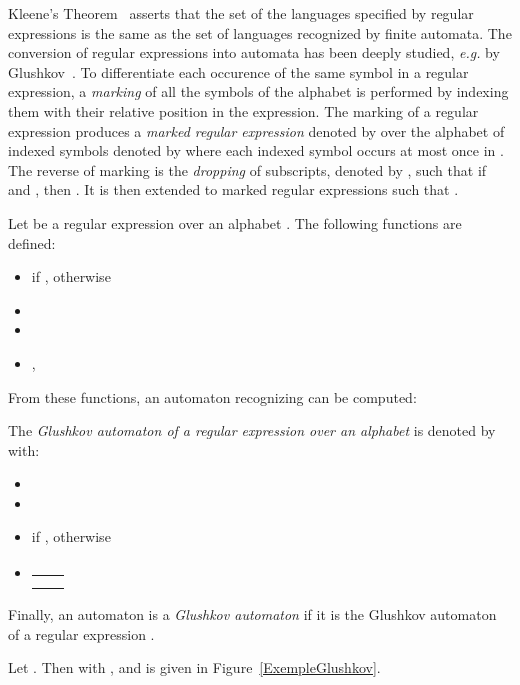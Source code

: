 \documentclass{llncs}
\begin{document}
    Kleene's Theorem~\cite{Kle56} asserts that the set of the languages specified by regular expressions is the same as the set of languages recognized by finite automata.
The conversion of regular expressions into automata has been deeply studied, \emph{e.g.} by Glushkov~\cite{Glu61}.
To differentiate each occurence of the same symbol in a regular expression, 
a \emph{marking} of all the symbols of the alphabet is performed by indexing them with their relative position in the expression. 
The marking of a regular expression  produces a \emph{marked regular expression} denoted by  over the alphabet of indexed symbols denoted by  where each indexed symbol occurs at most once in .
	The reverse of marking is the \emph{dropping} of subscripts, denoted by , such that if  and , then .
	It is then extended to marked regular expressions such that .
	
	Let  be a regular expression over an alphabet . The following functions are defined:
\begin{itemize}
	\item  if ,  otherwise
	\item 
	\item 
	\item , 
\end{itemize}

	From these functions, an automaton recognizing  can be computed:

\begin{definition}\label{def:Glushkov}
	The \emph{Glushkov automaton of a regular expression  over an alphabet } is denoted by  with:
	\begin{itemize}
		\item 
		\item 
		\item  if ,  otherwise
		\item  
		  \begin{tabular}[t]{l@{\ }l}
		   & \\
		  & 
		  \end{tabular}
	\end{itemize}
\end{definition}
Finally, an automaton is a \emph{Glushkov automaton} if it is the Glushkov automaton of a regular expression .

\begin{example}
	Let . Then  with , and  is given in Figure~\ref{ExempleGlushkov}.
\end{example}
\end{document}
